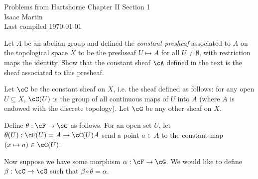 


\pagestyle{empty}
	\LARGE
\begin{center}
	Problems from Hartshorne Chapter II Section 1 \\
	\Large
	Isaac Martin \\
    Last compiled \today
\end{center}
\normalsize
\vspace{-2mm}
\hru
\begin{homework}[e]
	\prob Let $A$ be an abelian group and defined the \emph{constant presheaf} associated to $A$ on the topological space $X$ to be the preshseaf $U\mapsto A$ for all $U\neq \emptyset$, with restriction maps the identity. Show that the constant sheaf $\cA$ defined in the text is the sheaf associated to this presheaf.
	\begin{prf}
		Let $\cC$ be the constant sheaf on $X$, i.e. the sheaf defined as follows: for any open $U\subseteq X$, $\cC(U)$ is the group of all continuous maps of $U$ into $A$ (where $A$ is endowed with the discrete topology). Let $\cG$ be any other sheaf on $X$.

		Define $\theta:\cF\to \cC$ as follows. For an open set $U$, let $\theta(U):\cF(U) = A\to \cC(U)A$ send a point $a \in A$ to the constant map $(x \mapsto a)\in \cC(U)$.

		Now suppose we have some morphism $\alpha:\cF\to \cG$. We would like to define $\beta:\cC\to \cG$ such that $\beta\circ\theta = \alpha$.


\end{prf}
\end{homework}
